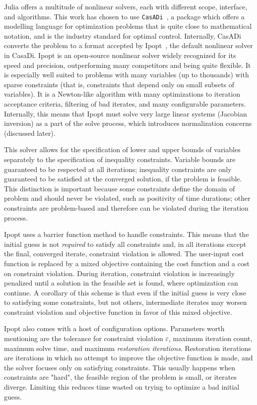 Julia offers a multitude of nonlinear solvers, each with different scope, interface, and algorithms. This work has chosen to use \texttt{CasADi}~\cite{casadi}, a package which offers a modelling language for optimization problems that is quite close to mathematical notation, and is the industry standard for optimal control. Internally, CasADi converts the problem to a format accepted by Ipopt~\cite{ipopt}, the default nonlinear solver in CasaDi. Ipopt is an open-source nonlinear solver widely recognized for its speed and precision, outperforming many competitors and being quite flexible. It is especially well suited to problems with many variables (up to thousands) with sparse constraints (that is, constraints that depend only on small subsets of variables). It is a Newton-like algorithm with many optimizations to iteration acceptance criteria, filtering of bad iterates, and many configurable parameters. Internally, this means that Ipopt must solve very large linear systems (Jacobian inversion) as a part of the solve process, which introduces normalization concerns (discussed later).

This solver allows for the specification of lower and upper bounds of variables separately to the specification of inequality constraints. Variable bounds are guaranteed to be respected at all iterations; inequality constraints are only guaranteed to be satisfied at the converged solution, if the problem is feasible. This distinction is important because some constraints define the domain of problem and should never be violated, such as positivity of time durations; other constraints are problem-based and therefore can be violated during the iteration process.

Ipopt uses a barrier function method to handle constraints. This means that the initial guess is not \textit{required} to satisfy all constraints and, in all iterations except the final, converged iterate, constraint violation is allowed. The user-input cost function is replaced by a mixed objective containing the cost function and a cost on constraint violation. During iteration, constraint violation is increasingly penalized until a solution in the feasible set is found, where optimization can continue. A corollary of this scheme is that even if the initial guess is very close to satisfying some constraints, but not others, intermediate iterates may worsen constraint violation and objective function in favor of this mixed objective.

Ipopt also comes with a host of configuration options. Parameters worth mentioning are the tolerance for constraint violation \(\varepsilon\), maximum iteration count, maximum solve time, and maximum \textit{restoration iterations}. Restoration iterations are iterations in which no attempt to improve the objective function is made, and the solver focuses only on satisfying constraints. This usually happens when constraints are "hard", the feasible region of the problem is small, or iterates diverge. Limiting this reduces time wasted on trying to optimize a bad initial guess.

